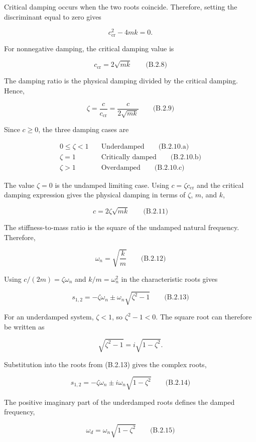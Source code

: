 Critical damping occurs when the two roots coincide. Therefore, setting the discriminant equal to zero gives

\[
c_{\mathrm{cr}}^2-4mk=0.
\]

For nonnegative damping, the critical damping value is

\[
\boxed{c_{\mathrm{cr}}=2\sqrt{mk}}
\qquad\text{(B.2.8)}
\]

The damping ratio is the physical damping divided by the critical damping. Hence,

\[
\boxed{\zeta=\frac{c}{c_{\mathrm{cr}}}=\frac{c}{2\sqrt{mk}}}
\qquad\text{(B.2.9)}
\]

Since $c\geq 0$, the three damping cases are

\[
\begin{aligned}
\boxed{0\leq\zeta<1}&\quad\text{Underdamped}\qquad\text{(B.2.10.a)}\\[2pt]
\boxed{\zeta=1}&\quad\text{Critically damped}\qquad\text{(B.2.10.b)}\\[2pt]
\boxed{\zeta>1}&\quad\text{Overdamped}\qquad\text{(B.2.10.c)}
\end{aligned}
\]

The value $\zeta=0$ is the undamped limiting case. Using $c=\zeta c_{\mathrm{cr}}$ and the critical damping expression gives the physical damping in terms of $\zeta$, $m$, and $k$,

\[
\boxed{c=2\zeta\sqrt{mk}}
\qquad\text{(B.2.11)}
\]

The stiffness-to-mass ratio is the square of the undamped natural frequency. Therefore,

\[
\boxed{\omega_n=\sqrt{\frac{k}{m}}}
\qquad\text{(B.2.12)}
\]

Using $c/(2m)=\zeta\omega_n$ and $k/m=\omega_n^2$ in the characteristic roots gives

\[
\boxed{s_{1,2}=-\zeta\omega_n\pm\omega_n\sqrt{\zeta^2-1}}
\qquad\text{(B.2.13)}
\]

For an underdamped system, $\zeta<1$, so $\zeta^2-1<0$. The square root can therefore be written as

\[
\sqrt{\zeta^2-1}=i\sqrt{1-\zeta^2}.
\]

Substitution into the roots from (B.2.13) gives the complex roots,

\[
\boxed{s_{1,2}=-\zeta\omega_n\pm i\omega_n\sqrt{1-\zeta^2}}
\qquad\text{(B.2.14)}
\]

The positive imaginary part of the underdamped roots defines the damped frequency,

\[
\boxed{\omega_d=\omega_n\sqrt{1-\zeta^2}}
\qquad\text{(B.2.15)}
\]

